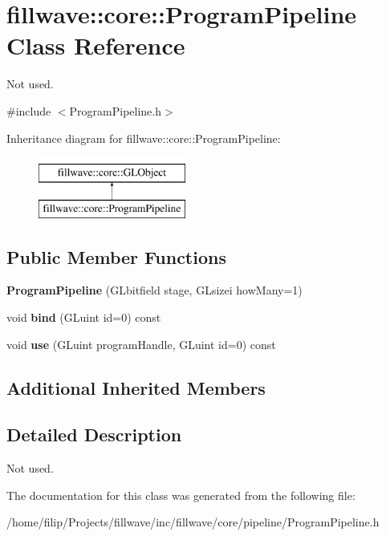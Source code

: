 \hypertarget{classfillwave_1_1core_1_1ProgramPipeline}{}\section{fillwave\+:\+:core\+:\+:Program\+Pipeline Class Reference}
\label{classfillwave_1_1core_1_1ProgramPipeline}


Not used.  




{\ttfamily \#include $<$Program\+Pipeline.\+h$>$}

Inheritance diagram for fillwave\+:\+:core\+:\+:Program\+Pipeline\+:\begin{figure}[H]
\begin{center}
\leavevmode
\includegraphics[height=2.000000cm]{classfillwave_1_1core_1_1ProgramPipeline}
\end{center}
\end{figure}
\subsection*{Public Member Functions}
\begin{DoxyCompactItemize}
\item 
\hypertarget{classfillwave_1_1core_1_1ProgramPipeline_a236be2c6be0b0b4ca96601e8af272500}{}{\bfseries Program\+Pipeline} (G\+Lbitfield stage, G\+Lsizei how\+Many=1)\label{classfillwave_1_1core_1_1ProgramPipeline_a236be2c6be0b0b4ca96601e8af272500}

\item 
\hypertarget{classfillwave_1_1core_1_1ProgramPipeline_a7b8d57c70b5da39475f7a6509314408a}{}void {\bfseries bind} (G\+Luint id=0) const \label{classfillwave_1_1core_1_1ProgramPipeline_a7b8d57c70b5da39475f7a6509314408a}

\item 
\hypertarget{classfillwave_1_1core_1_1ProgramPipeline_ae7c2bfb5eb8ed84a8899b38795aacdd4}{}void {\bfseries use} (G\+Luint program\+Handle, G\+Luint id=0) const \label{classfillwave_1_1core_1_1ProgramPipeline_ae7c2bfb5eb8ed84a8899b38795aacdd4}

\end{DoxyCompactItemize}
\subsection*{Additional Inherited Members}


\subsection{Detailed Description}
Not used. 

The documentation for this class was generated from the following file\+:\begin{DoxyCompactItemize}
\item 
/home/filip/\+Projects/fillwave/inc/fillwave/core/pipeline/Program\+Pipeline.\+h\end{DoxyCompactItemize}
